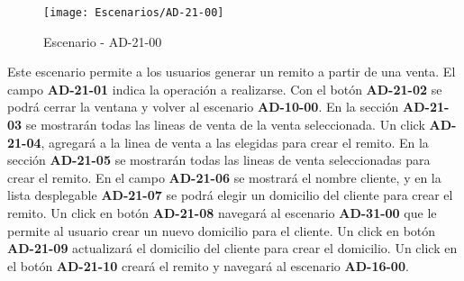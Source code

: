 \begin{figure}[H]
\centering
\texttt{[image: Escenarios/AD-21-00]}
\caption{Escenario - AD-21-00}
\label{fig:AD-21-00}
\end{figure}
Este escenario permite a los usuarios generar un remito a partir de una venta. El campo \textbf{AD-21-01} indica la operación a realizarse. Con el botón \textbf{AD-21-02} se podrá cerrar la ventana y volver al escenario \textbf{AD-10-00}. 
En la sección \textbf{AD-21-03} se mostrarán todas las lineas de venta de la venta seleccionada. Un click \textbf{AD-21-04}, agregará a la linea de venta a las elegidas para crear el remito. En la sección \textbf{AD-21-05} se mostrarán todas las lineas de venta seleccionadas para crear el remito.
En el campo \textbf{AD-21-06} se mostrará el nombre cliente, y en la lista desplegable \textbf{AD-21-07} se podrá elegir un domicilio del cliente para crear el remito. Un click en botón \textbf{AD-21-08} navegará al escenario \textbf{AD-31-00} que le permite al usuario crear un nuevo domicilio para el cliente. Un click en botón \textbf{AD-21-09} actualizará el domicilio del cliente para crear el domicilio.
Un click en el botón \textbf{AD-21-10} creará el remito y navegará al escenario \textbf{AD-16-00}.
\\
